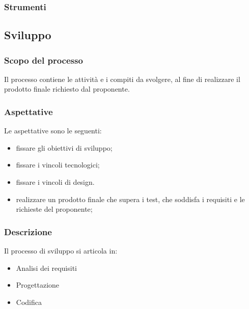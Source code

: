 		\subsubsection{Strumenti}

     
\subsection{Sviluppo}
	\subsubsection{Scopo del processo}
	Il processo contiene le attività e i compiti da svolgere, al fine di realizzare il prodotto finale richiesto dal proponente.
	\subsubsection{Aspettative}
	Le aspettative sono le seguenti:
	\begin{itemize}
		\item fissare gli obiettivi di sviluppo;
		\item fissare i vincoli tecnologici;
		\item fissare i vincoli di design.
		\item realizzare un prodotto finale che supera i test, che soddisfa i requisiti e le richieste del proponente;
	\end{itemize}
	\subsubsection{Descrizione}
	Il processo di sviluppo si articola in:
	\begin{itemize}
		\item Analisi dei requisiti
		\item Progettazione
		\item Codifica	
	\end{itemize}

